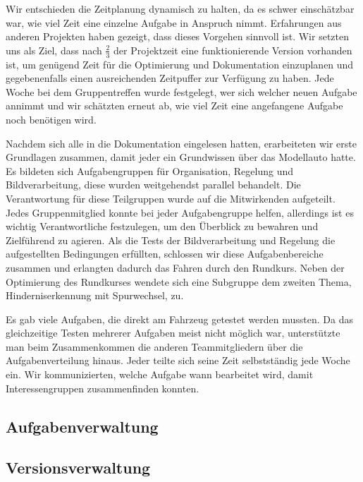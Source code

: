 Wir entschieden die Zeitplanung dynamisch zu halten, da es schwer einschätzbar war, wie viel Zeit eine einzelne Aufgabe in Anspruch nimmt. Erfahrungen aus anderen Projekten haben gezeigt, dass dieses Vorgehen sinnvoll ist. Wir setzten uns als Ziel, dass nach $\frac{2}{3}$ der Projektzeit eine funktionierende Version vorhanden ist, um genügend Zeit für die Optimierung und Dokumentation einzuplanen und gegebenenfalls einen ausreichenden Zeitpuffer zur Verfügung zu haben. Jede Woche bei dem Gruppentreffen wurde festgelegt, wer sich welcher neuen Aufgabe annimmt und wir schätzten erneut ab, wie viel Zeit eine angefangene Aufgabe noch benötigen wird.


Nachdem sich alle in die Dokumentation eingelesen hatten, erarbeiteten wir erste Grundlagen zusammen, damit jeder ein Grundwissen über das Modellauto hatte. Es bildeten sich Aufgabengruppen für Organisation, Regelung und Bildverarbeitung, diese wurden weitgehendst parallel behandelt. Die Verantwortung für diese Teilgruppen wurde auf die Mitwirkenden aufgeteilt. Jedes Gruppenmitglied konnte bei jeder Aufgabengruppe helfen, allerdings ist es wichtig Verantwortliche festzulegen, um den Überblick zu bewahren und Zielführend zu agieren. Als die Tests der Bildverarbeitung und Regelung die aufgestellten Bedingungen erfüllten, schlossen wir diese Aufgabenbereiche zusammen und erlangten dadurch das Fahren durch den Rundkurs. Neben der Optimierung des Rundkurses wendete sich eine Subgruppe dem zweiten Thema, Hinderniserkennung mit Spurwechsel, zu.

Es gab viele Aufgaben, die direkt am Fahrzeug getestet werden mussten. Da das gleichzeitige Testen mehrerer Aufgaben meist nicht möglich war, unterstützte man beim Zusammenkommen die anderen Teammitgliedern über die Aufgabenverteilung hinaus. Jeder teilte sich seine Zeit selbstständig jede Woche ein. Wir kommunizierten, welche Aufgabe wann bearbeitet wird, damit Interessengruppen zusammenfinden konnten. 

\subsection{Aufgabenverwaltung}
\label{sec:aufgabenverwaltung}


\subsection{Versionsverwaltung}
\label{sec:versionsverwaltung}
